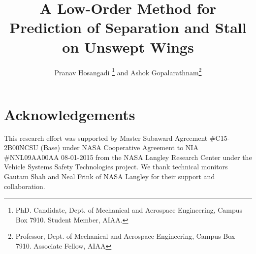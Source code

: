 \documentclass[conf]{new-aiaa} %
\title{A Low-Order Method for Prediction of Separation and Stall on Unswept Wings}
\author{Pranav Hosangadi \footnote{PhD. Candidate, Dept. of Mechanical and Aerospace Engineering, Campus Box 7910. Student Member, AIAA.}
and Ashok Gopalarathnam\footnote{Professor, Dept. of Mechanical and Aerospace Engineering, Campus Box 7910. Associate Fellow, AIAA}}
\affil{North Carolina State University, Raleigh, NC 27695-7910}
\begin{document}
\maketitle



\newcommand{\methodname}{low-order method~}
\newcommand{\methodabbr}{LOM~}

\newcommand{\aefftarget}{\ensuremath{\alpha_\text{eff}^\text{target}}}
\newcommand{\aeffprime}{\ensuremath{\alpha_\text{eff}'}}

\newcommand*{\doi}[1]{doi: \url{#1}}




% 
% 
% 
% 
% 


{\printnomenclature}


 
 
 
 
 
 


\section*{Acknowledgements}
This research effort was supported by Master Subaward Agreement \#C15-2B00NCSU (Base) under NASA Cooperative Agreement to NIA \#NNL09AA00AA 08-01-2015 from the NASA Langley Research Center under the Vehicle Systems Safety Technologies project. We thank technical monitors Gautam Shah and Neal Frink of NASA Langley for their support and collaboration.


\end{document}
